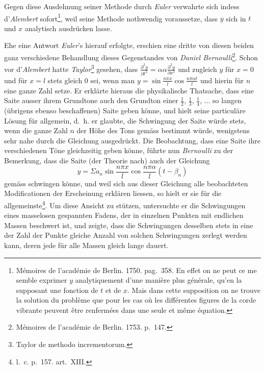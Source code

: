 \documentclass[12pt,a4paper]{article}
\begin{document}
Gegen diese Ausdehnung seiner Methode durch \textit{Euler} verwahrte sich indess d'\textit{Alembert} sofort\footnote{Mémoires de l'académie de Berlin. 1750. pag.~358. En effet on ne peut ce me semble exprimer $y$ analytiquement d'une manière plus générale, qu'en la supposant une fonction de $t$ et de $x$. Mais dans cette supposition on ne trouve la solution du problème que pour les cas où les différentes figures de la corde vibrante peuvent être renfermées dans une seule et même équation.}, weil seine Methode nothwendig voraussetze, dass $y$ sich in $t$ und $x$ analytisch ausdrücken lasse.

Ehe eine Antwort \textit{Euler}'s hierauf erfolgte, erschien eine dritte von diesen beiden ganz verschiedene Behandlung dieses Gegenstandes von \textit{Daniel Bernoulli}\footnote{Mémoires de l'académie de Berlin. 1753. p.~147.}. Schon vor d'\textit{Alembert} hatte \textit{Taylor}\footnote{Taylor de methodo incrementorum.} gesehen, dass $\frac{\partial^2 y}{\partial t^2} = \alpha\alpha\frac{\partial^2 y}{\partial x^2}$ und zugleich $y$ für $x = 0$ und für $x = l$ stets gleich $0$ sei, wenn man $y = \sin\frac{n\pi x}{l}\cos\frac{n\pi\alpha t}{l}$ und hierin für $n$ eine ganze Zahl setze. Er erklärte hieraus die physikalische Thatsache, dass eine Saite ausser ihrem Grundtone auch den Grundton einer $\frac{1}{2}$, $\frac{1}{3}$, $\frac{1}{4}$, $\ldots$ so langen (übrigens ebenso beschaffenen) Saite geben könne, und hielt seine particuläre Lösung für allgemein, d.~h. er glaubte, die Schwingung der Saite würde stets, wenn die ganze Zahl $n$ der Höhe des Tons gemäss bestimmt würde, wenigstens sehr nahe durch die Gleichung ausgedrückt. Die Beobachtung, dass eine Saite ihre verschiedenen Töne gleichzeitig geben könne, führte nun \textit{Bernoulli} zu der Bemerkung, dass die Saite (der Theorie nach) auch der Gleichung
\[ y = \Sigma a_n\sin\frac{n\pi x}{l}\cos\frac{n\pi\alpha}{l}(t - \beta_n) \]
gemäss schwingen könne, und weil sich aus dieser Gleichung alle beobachteten Modificationen der Erscheinung erklären liessen, so hielt er sie für die allgemeinste\footnote{l.~c. p.~157. art.~XIII.}. Um diese Ansicht zu stützen, untersuchte er die Schwingungen eines masselosen gespannten Fadens, der in einzelnen Punkten mit endlichen Massen beschwert ist, und zeigte, dass die Schwingungen desselben stets in eine der Zahl der Punkte gleiche Anzahl von solchen Schwingungen zerlegt werden kann, deren jede für alle Massen gleich lange dauert.
\end{document}
